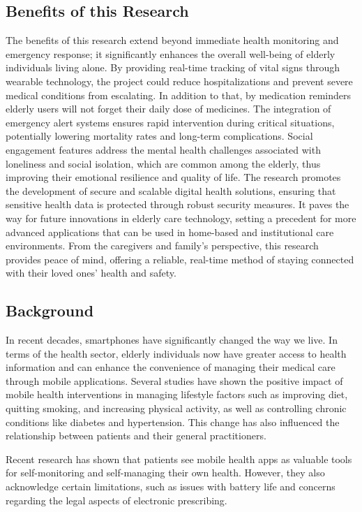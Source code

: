 \documentclass[a4paper, 12pt]{article}
\begin{document}
\subsection{Benefits of this Research}

The benefits of this research extend beyond immediate health monitoring and emergency response; it significantly enhances the overall well-being of elderly individuals living alone. By providing real-time tracking of vital signs through wearable technology, the project could reduce hospitalizations and prevent severe medical conditions from escalating. In addition to that, by medication reminders elderly users will not forget their daily dose of medicines.
The integration of emergency alert systems ensures rapid intervention during critical situations, potentially lowering mortality rates and long-term complications. Social engagement features address the mental health challenges associated with loneliness and social isolation, which are common among the elderly, thus improving their emotional resilience and quality of life.
The research promotes the development of secure and scalable digital health solutions, ensuring that sensitive health data is protected through robust security measures. It paves the way for future innovations in elderly care technology, setting a precedent for more advanced applications that can be used in home-based and institutional care environments. From the caregivers and family’s perspective, this research provides peace of mind, offering a reliable, real-time method of staying connected with their loved ones' health and safety.

\subsection{Background}

In recent decades, smartphones have significantly changed the way we live. In terms of the health sector, elderly individuals now have greater access to health information and can enhance the convenience of managing their medical care through mobile applications. Several studies have shown the positive impact of mobile health interventions in managing lifestyle factors such as improving diet, quitting smoking, and increasing physical activity, as well as controlling chronic conditions like diabetes and hypertension. This change has also influenced the relationship between patients and their general practitioners.

Recent research has shown that patients see mobile health apps as valuable tools for self-monitoring and self-managing their own health. However, they also acknowledge certain limitations, such as issues with battery life and concerns regarding the legal aspects of electronic prescribing.
\end{document}
